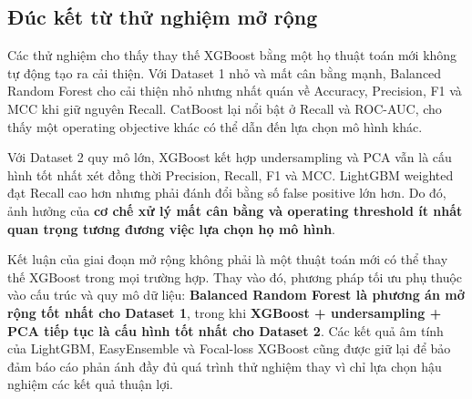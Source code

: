 \subsection{Đúc kết từ thử nghiệm mở rộng}

Các thử nghiệm cho thấy thay thế XGBoost bằng một họ thuật toán mới không tự động tạo ra cải thiện. Với Dataset 1 nhỏ và mất cân bằng mạnh, Balanced Random Forest cho cải thiện nhỏ nhưng nhất quán về Accuracy, Precision, F1 và MCC khi giữ nguyên Recall. CatBoost lại nổi bật ở Recall và ROC-AUC, cho thấy một operating objective khác có thể dẫn đến lựa chọn mô hình khác.

Với Dataset 2 quy mô lớn, XGBoost kết hợp undersampling và PCA vẫn là cấu hình tốt nhất xét đồng thời Precision, Recall, F1 và MCC. LightGBM weighted đạt Recall cao hơn nhưng phải đánh đổi bằng số false positive lớn hơn. Do đó, ảnh hưởng của \textbf{cơ chế xử lý mất cân bằng và operating threshold ít nhất quan trọng tương đương việc lựa chọn họ mô hình}.

Kết luận của giai đoạn mở rộng không phải là một thuật toán mới có thể thay thế XGBoost trong mọi trường hợp. Thay vào đó, phương pháp tối ưu phụ thuộc vào cấu trúc và quy mô dữ liệu: \textbf{Balanced Random Forest là phương án mở rộng tốt nhất cho Dataset 1}, trong khi \textbf{XGBoost + undersampling + PCA tiếp tục là cấu hình tốt nhất cho Dataset 2}. Các kết quả âm tính của LightGBM, EasyEnsemble và Focal-loss XGBoost cũng được giữ lại để bảo đảm báo cáo phản ánh đầy đủ quá trình thử nghiệm thay vì chỉ lựa chọn hậu nghiệm các kết quả thuận lợi.

